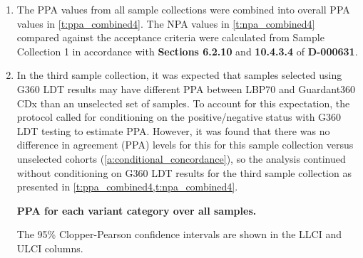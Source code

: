 \documentclass[12pt]{protocol}
\begin{document}
\begin{enumerate}
\begin{enumerate}
            \captionsetup{justification=justified,singlelinecheck=off,skip=0pt}
            \begin{table}[H]
            \centering
            \begin{threeparttable}
            \caption{\textbf{NPA, P(G360 CDx\textminus | LBP70\textminus), 
                for each sample collection and variant category.}}
            \label{t:npa_summary_collections_rawrawraw}
            
            \caption*{``n''
            is the number of \textcolor{blue}{variant sites as defined in 
            Section 6.2.9 of \textbf{D-000631}. During the analysis, it was
            found that the incorrect ``n'' was used for panel-wide Indels
            in report \textbf{D-000089}. In that report, the number of evaluable
            SNV sites was applied to the Indel category as well. In the analysis for this
            report, this was corrected. The change had a very slight impact
            on panel-wide Indel NPA values which did not affect any conclusions.}}
            \end{threeparttable}
            \end{table}
            
      \item The PPA values from all sample collections were combined into overall PPA values in
          \cref{t:ppa_combined4}. The NPA values in \cref{t:npa_combined4} compared against the
          acceptance criteria were calculated from Sample Collection 1 in accordance with
          \textbf{Sections 6.2.10} and \textbf{10.4.3.4} of \textbf{D-000631}.
      \item\label{i:not_condition} In the third sample collection, it was expected that samples
          selected using G360 LDT results may have different PPA between LBP70 and Guardant360 CDx
          than an unselected set of samples. To account for this expectation, the protocol called
          for conditioning on the positive/negative status with G360 LDT testing to estimate PPA.
          However, it was found that there was no difference in agreement (PPA) levels for this
          for this sample collection versus unselected cohorts
          (\cref{a:conditional_concordance}), so the analysis continued without conditioning on
          G360 LDT results for the third sample collection as presented in
          \cref{t:ppa_combined4,t:npa_combined4}.
      
            \captionsetup{justification=justified,singlelinecheck=off,skip=0pt}
            \begin{table}[H]
            \centering
            \begin{threeparttable}
            \caption[PPA for each variant category over all samples]
            {\textbf{PPA for each variant category over all samples.}}
            \label{t:ppa_combined4}
            
            \caption*{The 95\% Clopper-Pearson confidence intervals are shown 
            in the LLCI and ULCI columns.}
            \end{threeparttable}
            \end{table}
            

\end{enumerate}
\end{enumerate}
\end{document}
